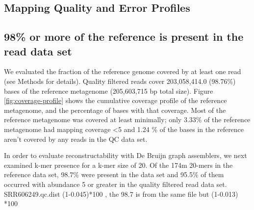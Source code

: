 \documentclass[10pt,a4paper,twocolumn]{article}
\begin{document}
\subsection*{Mapping Quality and Error Profiles}


\subsection*{98\% or more of the reference is present in the read data set}

We evaluated the fraction of the reference genome covered by at least
one read (see Methods for details). Quality filtered reads cover
203,058,414.0 (98.76\%) bases of the reference metagenome (205,603,715
bp total size).  Figure \ref{fig:coverage-profile} shows the
cumulative coverage profile of the reference metagenome, and the
percentage of bases with that coverage. Most of the reference
metagenome was covered at least minimally; only 3.33\% of the
reference metagenome had mapping coverage \textless 5 and 1.24 \% of
the bases in the reference aren’t covered by any reads in the QC data
set.


In order to evaluate reconstructability with De Bruijn graph
assemblers, we next examined k-mer presence for a k-mer size of 20. Of
the 174m 20-mers in the reference data set, 98.7\% were present in the
data set and 95.5\% of them occurred with abundance 5 or greater in
the quality filtered read data set.  %
SRR606249.qc.dist (1-0.045)*100 , the 98.7 is from the same file but
(1-0.013) *100
\end{document}
